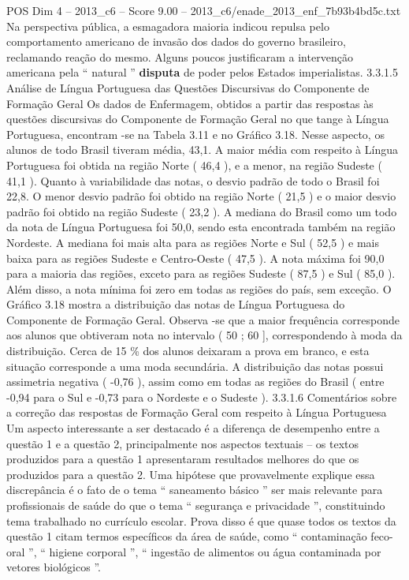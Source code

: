 \begin{textsample}{POS Dim 4 – 2013\_c6 – Score 9.00 – 2013\_c6/enade\_2013\_enf\_7b93b4bd5c.txt}
Na perspectiva pública, a esmagadora maioria indicou repulsa pelo comportamento americano de invasão dos dados do governo brasileiro, reclamando reação do mesmo.
Alguns poucos justificaram a intervenção americana pela “ natural ” \textbf{disputa} de poder pelos Estados imperialistas. 3.3.1.5 Análise de Língua Portuguesa das Questões Discursivas do Componente de Formação Geral Os dados de Enfermagem, obtidos a partir das respostas às questões discursivas do Componente de Formação Geral no que tange à Língua Portuguesa, encontram -se na Tabela 3.11 e no Gráfico 3.18.
Nesse aspecto, os alunos de todo Brasil tiveram média, 43,1.
A maior média com respeito à Língua Portuguesa foi obtida na região Norte ( 46,4 ), e a menor, na região Sudeste ( 41,1 ).
Quanto à variabilidade das notas, o desvio padrão de todo o Brasil foi 22,8.
O menor desvio padrão foi obtido na região Norte ( 21,5 ) e o maior desvio padrão foi obtido na região Sudeste ( 23,2 ).
A mediana do Brasil como um todo da nota de Língua Portuguesa foi 50,0, sendo esta encontrada também na região Nordeste.
A mediana foi mais alta para as regiões Norte e Sul ( 52,5 ) e mais baixa para as regiões Sudeste e Centro-Oeste ( 47,5 ).
A nota máxima foi 90,0 para a maioria das regiões, exceto para as regiões Sudeste ( 87,5 ) e Sul ( 85,0 ).
Além disso, a nota mínima foi zero em todas as regiões do país, sem exceção.
O Gráfico 3.18 mostra a distribuição das notas de Língua Portuguesa do Componente de Formação Geral.
Observa -se que a maior frequência corresponde aos alunos que obtiveram nota no intervalo ( 50 ; 60 ], correspondendo à moda da distribuição.
Cerca de 15 \% dos alunos deixaram a prova em branco, e esta situação corresponde a uma moda secundária.
A distribuição das notas possui assimetria negativa ( -0,76 ), assim como em todas as regiões do Brasil ( entre -0,94 para o Sul e -0,73 para o Nordeste e o Sudeste ). 3.3.1.6 Comentários sobre a correção das respostas de Formação Geral com respeito à Língua Portuguesa Um aspecto interessante a ser destacado é a diferença de desempenho entre a questão 1 e a questão 2, principalmente nos aspectos textuais – os textos produzidos para a questão 1 apresentaram resultados melhores do que os produzidos para a questão 2.
Uma hipótese que provavelmente explique essa discrepância é o fato de o tema “ saneamento básico ” ser mais relevante para profissionais de saúde do que o tema “ segurança e privacidade ”, constituindo tema trabalhado no currículo escolar.
Prova disso é que quase todos os textos da questão 1 citam termos específicos da área de saúde, como “ contaminação feco-oral ”, “ higiene corporal ”, “ ingestão de alimentos ou água contaminada por vetores biológicos ”.

\end{textsample}
